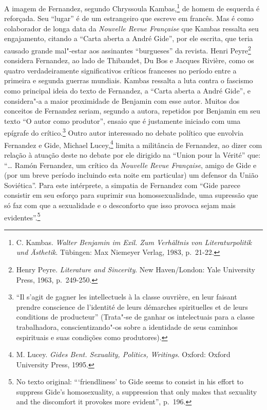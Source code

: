A imagem de Fernandez, segundo Chryssoula Kambas,\footnote{C. Kambas.
  \emph{Walter Benjamin im Exil. Zum Verhältnis von Literaturpolitik und
  Ästhetik}. Tübingen: Max Niemeyer Verlag, 1983, p.~21-22.} de homem de
esquerda é reforçada. Seu ``lugar'' é de um estrangeiro que escreve em
francês. Mas é como colaborador de longa data da \emph{Nouvelle Revue
Française} que Kambas ressalta seu engajamento, citando a ``Carta aberta
a André Gide'', por ele escrita, que teria causado grande mal"-estar aos
assinantes ``burgueses'' da revista. Henri Peyre\footnote{Henry Peyre.
  \emph{Literature and Sincerity}. New Haven/London: Yale University
  Press, 1963, p.~249-250.} considera Fernandez, ao lado de Thibaudet, Du
Bos e Jacques Rivière, como os quatro verdadeiramente significativos
críticos franceses no período entre a primeira e segunda guerras
mundiais. Kambas ressalta a luta contra o fascismo como principal ideia do
texto de Fernandez, a ``Carta aberta a André Gide'', e considera"-a a
maior proximidade de Benjamin com esse autor. Muitos dos conceitos de
Fernandez seriam, segundo a autora, repetidos por Benjamin em seu texto
``O autor como produtor'', ensaio que é justamente iniciado com uma
epígrafe do crítico.\footnote{``Il s'agit de gagner les intellectuels à
  la classe ouvrière, en leur faisant prendre conscience de l'identité
  de leurs démarches spirituelles et de leurs conditions de producteur''
  (Trata"-se de ganhar os intelectuais para a classe trabalhadora,
  conscientizando"-os sobre a identidade de seus caminhos espirituais e
  suas condições como produtores).} Outro autor interessado no debate
político que envolvia Fernandez e Gide, Michael Lucey,\footnote{M.
  Lucey. \emph{Gides Bent. Sexuality, Politics, Writings}. Oxford:
  Oxford University Press, 1995.} limita a militância de Fernandez, ao
dizer com relação à atuação deste no debate por ele dirigido na ``Union
pour la Vérité'' que: ``\ldots{} Ramón Fernandez, um crítico da \emph{Nouvelle
Revue Française}, amigo de Gide e (por um breve período incluindo esta
noite em particular) um defensor da União Soviética''. Para este
intérprete, a simpatia de Fernandez com ``Gide parece consistir em seu
esforço para suprimir sua homossexualidade, uma supressão que só faz com
que a sexualidade e o desconforto que isso provoca sejam mais
evidentes''.\footnote{No texto original: ```friendliness' to Gide seems
  to consist in his effort to suppress Gide's homosexuality, a
  suppression that only makes that sexuality and the discomfort it
  provokes more evident'', p.~196.}

